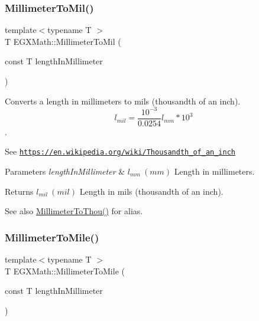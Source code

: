\subsubsection{\texorpdfstring{Millimeter\+To\+Mil()}{MillimeterToMil()}}
{\footnotesize\ttfamily template$<$typename T $>$ \\
T E\+G\+X\+Math\+::\+Millimeter\+To\+Mil (\begin{DoxyParamCaption}\item[{const T}]{length\+In\+Millimeter }\end{DoxyParamCaption})}



Converts a length in millimeters to mils (thousandth of an inch). \[ l_{mil}= \frac{10^{-3}}{0.0254} l_{mm} * 10^{3} \]. 

See \href{https://en.wikipedia.org/wiki/Thousandth_of_an_inch}{\tt https\+://en.\+wikipedia.\+org/wiki/\+Thousandth\+\_\+of\+\_\+an\+\_\+inch} 
\begin{DoxyParams}{Parameters}
{\em length\+In\+Millimeter} & $ l_{mm}\ (mm)$ Length in millimeters. \\
\hline
\end{DoxyParams}
\begin{DoxyReturn}{Returns}
$ l_{mil}\ (mil)$ Length in mils (thousandth of an inch). 
\end{DoxyReturn}
\begin{DoxySeeAlso}{See also}
\mbox{\hyperlink{group___e_g_x_math-_conversions-_length_conversions-_s_i-_millimeter-_imperial_ga099bde3b0f85fbbfbe91f0162a392835}{Millimeter\+To\+Thou()}} for alias. 
\end{DoxySeeAlso}
\mbox{\label{group___e_g_x_math-_conversions-_length_conversions-_s_i-_millimeter-_imperial_ga8a11dcd8f7866189b30e01d65e003e2d}} 
\subsubsection{\texorpdfstring{Millimeter\+To\+Mile()}{MillimeterToMile()}}
{\footnotesize\ttfamily template$<$typename T $>$ \\
T E\+G\+X\+Math\+::\+Millimeter\+To\+Mile (\begin{DoxyParamCaption}\item[{const T}]{length\+In\+Millimeter }\end{DoxyParamCaption})}



